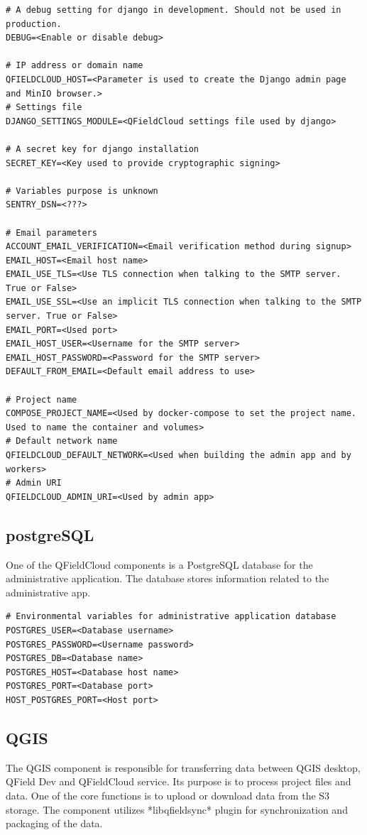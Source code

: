 \documentclass{article}
\begin{document}
\begin{verbatim}
# A debug setting for django in development. Should not be used in production.
DEBUG=<Enable or disable debug>

# IP address or domain name
QFIELDCLOUD_HOST=<Parameter is used to create the Django admin page and MinIO browser.>
# Settings file
DJANGO_SETTINGS_MODULE=<QFieldCloud settings file used by django>

# A secret key for django installation
SECRET_KEY=<Key used to provide cryptographic signing>

# Variables purpose is unknown
SENTRY_DSN=<???>

# Email parameters
ACCOUNT_EMAIL_VERIFICATION=<Email verification method during signup>
EMAIL_HOST=<Email host name>
EMAIL_USE_TLS=<Use TLS connection when talking to the SMTP server. True or False>
EMAIL_USE_SSL=<Use an implicit TLS connection when talking to the SMTP server. True or False>
EMAIL_PORT=<Used port>
EMAIL_HOST_USER=<Username for the SMTP server>
EMAIL_HOST_PASSWORD=<Password for the SMTP server>
DEFAULT_FROM_EMAIL=<Default email address to use>

# Project name
COMPOSE_PROJECT_NAME=<Used by docker-compose to set the project name. Used to name the container and volumes>
# Default network name
QFIELDCLOUD_DEFAULT_NETWORK=<Used when building the admin app and by workers>
# Admin URI
QFIELDCLOUD_ADMIN_URI=<Used by admin app>
\end{verbatim}

\subsection{postgreSQL}
\begin{markdown}
One of the QFieldCloud components is a PostgreSQL database for the administrative application. The database stores information related to the administrative app.
\end{markdown}

\begin{verbatim}
# Environmental variables for administrative application database
POSTGRES_USER=<Database username>
POSTGRES_PASSWORD=<Username password>
POSTGRES_DB=<Database name>
POSTGRES_HOST=<Database host name>
POSTGRES_PORT=<Database port>
HOST_POSTGRES_PORT=<Host port>
\end{verbatim}

\subsection{QGIS}
\begin{markdown}
The QGIS component is responsible for transferring data between QGIS desktop, QField Dev and QFieldCloud service. Its purpose is to process project files and data. One of the core functions is to upload or download data from the S3 storage. The component utilizes *libqfieldsync* plugin for synchronization and packaging of the data.
\end{markdown}
\end{document}
